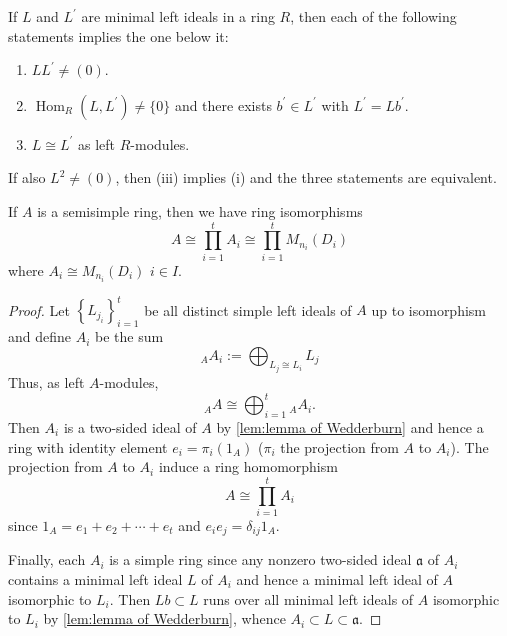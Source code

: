 \begin{lemma}
    \label{lem:lemma of Wedderburn}
    If $L$ and $L^{\prime}$ are minimal left ideals in a ring $R$, then each of the following statements implies the one below it:
    \begin{enumerate}
        \item
              $L L^{\prime} \neq(0)$.
        \item
              $\operatorname{Hom}_R\left(L, L^{\prime}\right) \neq\{0\}$ and there exists $b^{\prime} \in L^{\prime}$ with $L^{\prime}=L b^{\prime}$.
        \item
              $L \cong L^{\prime}$ as left $R$-modules.
    \end{enumerate}
    If also $L^2 \neq(0)$, then (iii) implies (i) and the three statements are equivalent.
\end{lemma}
\begin{theorem}
    If $A$ is a semisimple ring, then we have ring isomorphisms
    \begin{equation*}
        A
        \cong
        \prod_{i=1}^t  A_i
        \cong \prod_{i=1}^t M_{n_i}\left(D_i\right)
    \end{equation*}
    where $A_i\cong M_{n_i}\left(D_i\right)$ $i \in I$.
    \begin{proof}
        Let $\left\{L_{j_i}\right\}_{i=1}^t$ be all distinct simple left ideals of $A$ up to isomorphism and define $A_i$ be the sum
        \begin{equation*}
            {}_A A_i
            :=
            \bigoplus_{L_j \cong L_i} L_j
        \end{equation*}
        Thus, as left $A$-modules,
        \[
            {}_A A \cong \bigoplus_{i=1}^t {}_A A_i.
        \]
        Then $A_i$ is a two-sided ideal of $A$ by \cref{lem:lemma of Wedderburn} and hence a ring with identity element $e_i=\pi_i(1_A)$ ($\pi_i$ the projection from $A$ to $A_i$).
        The projection from $A$ to $A_i$ induce a ring homomorphism
        \begin{equation*}
            A\cong \prod_{i=1}^t A_i
        \end{equation*}
        since $1_A=e_1+e_2+\cdots+e_t$ and $e_i e_j=\delta_{ij} 1_A$.

        Finally, each $A_i$ is a simple ring since any nonzero two-sided ideal $\mathfrak{a}$ of $A_i$ contains a minimal left ideal $L$ of $A_i$ and hence a minimal left ideal of $A$ isomorphic to $L_i$. Then $Lb\subset L$ runs over all minimal left ideals of $A$ isomorphic to $L_i$ by \cref{lem:lemma of Wedderburn}, whence $A_i \subset L\subset \mathfrak{a}$.
    \end{proof}
\end{theorem}

